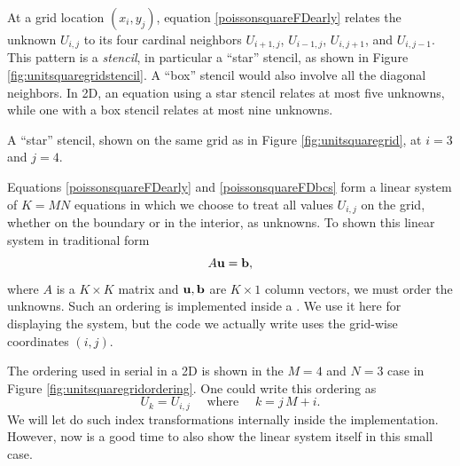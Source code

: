 At a grid location $(x_i,y_j)$, equation \eqref{poissonsquareFDearly} relates the unknown $U_{i,j}$ to its four cardinal neighbors $U_{i+1,j}$, $U_{i-1,j}$, $U_{i,j+1}$, and $U_{i,j-1}$.  This pattern is a \emph{stencil}, in particular a ``star'' stencil, as shown in Figure \ref{fig:unitsquaregridstencil}.  A ``box'' stencil would also involve all the diagonal neighbors.  In 2D, an equation using a star stencil relates at most five unknowns, while one with a box stencil relates at most nine unknowns.

\begin{marginfigure}
\caption{A ``star'' stencil, shown on the same grid as in Figure \ref{fig:unitsquaregrid}, at $i=3$ and $j=4$.}
\label{fig:unitsquaregridstencil}
\end{marginfigure}

Equations \eqref{poissonsquareFDearly} and \eqref{poissonsquareFDbcs} form a linear system of $K=MN$ equations in which we choose to treat all values $U_{i,j}$ on the grid, whether on the boundary or in the interior, as unknowns.  To shown this linear system in traditional form
\begin{equation}
A \mathbf{u} = \mathbf{b},
\end{equation}
where $A$ is a $K\times K$ matrix and $\mathbf{u},\mathbf{b}$ are $K\times 1$ column vectors, we must order the unknowns.  Such an ordering is implemented inside a \PETSc \pDMDA.  We use it here for displaying the system, but the code we actually write uses the grid-wise coordinates $(i,j)$.

The ordering used in serial in a 2D \pDMDA is shown in the $M=4$ and $N=3$ case in Figure \ref{fig:unitsquaregridordering}.  One could write this ordering as
\begin{equation}
    U_k = U_{i,j} \quad \text{ where } \quad k = j\,M + i. \label{orderingfd}
\end{equation}
We will let \PETSc do such index transformations internally inside the \pDMDA implementation.  However, now is a good time to also show the linear system itself in this small case.

